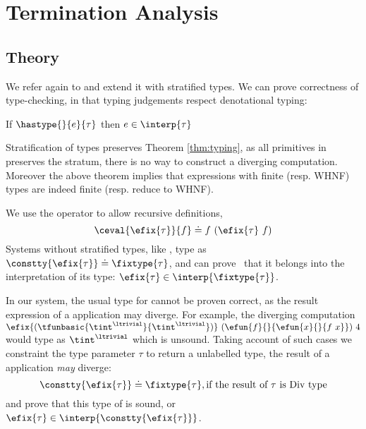 \section{Termination Analysis}\label{sec:termination}
\subsection{Theory}

We refer again to \undeclang 
and extend it with stratified types.
%
We can prove correctness of type-checking, in that 
typing judgements respect denotational typing:
%
\begin{theorem}\label{thm:typing}
If $\hastype{}{e}{\tau}$ then $e \in \interp{\tau}$
\end{theorem} 
%
Stratification of types preserves Theorem \ref{thm:typing}, 
as all primitives in \undeclang preserves the stratum, 
\ie there is no way to construct a diverging computation.
%
Moreover the above theorem implies that 
expressions with finite (resp. WHNF) types 
are indeed finite (resp. reduce to WHNF).

We use the \efix{} operator to allow recursive definitions,
%
$$\ceval{\efix{\tau}}{f} \doteq f\ (\efix{\tau}\ f) $$
%
Systems without stratified types, like \hlang,
type \efix{\tau} as
$\constty{\efix{\tau}}\doteq{\fixtype{\tau}}$,
and can prove~\citep{PLC} that it belongs
into the interpretation of its type:
$\efix{\tau} \in \interp{\fixtype{\tau}}$.

In our system, the usual type for \efix{\tau}
cannot be proven correct, 
as the result expression of a \efix{\tau}
application may diverge.
%
For example, the diverging computation
$\efix{{(\tfunbasic{\tint^\ltrivial}{\tint^\ltrivial})}}\ 
	(\efun{f}{}{\efun{x}{}{f\ x}})\  4$
would type as $\tint^\ltrivial$
which is unsound.
%
Taking account of such cases we constraint 
the type parameter $\tau$ to return a unlabelled type,
\ie the result of a \efix{\tau} application \textit{may}
diverge:
%
$$\constty{\efix{\tau}} \doteq {\fixtype{\tau}}, 
	\text{if the result of}\ \tau\ \text{is Div type}$$
%
and prove that this type of \efix{\tau}
is sound, or $\efix{\tau} \in \interp{\constty{\efix{\tau}}}$.

